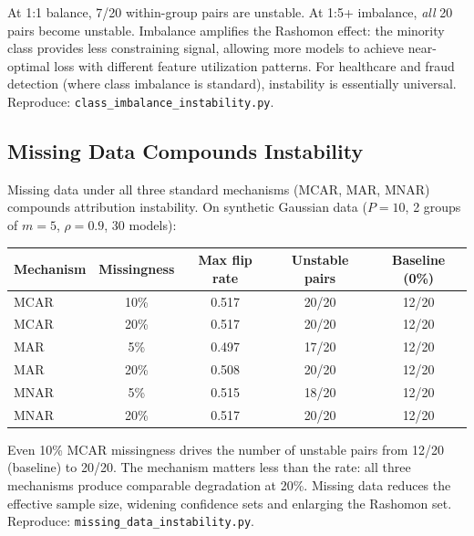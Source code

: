 \documentclass{article}
\begin{document}

At 1:1 balance, 7/20 within-group pairs are unstable. At 1:5+ imbalance, \emph{all} 20 pairs become unstable. Imbalance amplifies the Rashomon effect: the minority class provides less constraining signal, allowing more models to achieve near-optimal loss with different feature utilization patterns. For healthcare and fraud detection (where class imbalance is standard), instability is essentially universal.
Reproduce: \texttt{class\_imbalance\_instability.py}.

\subsection{Missing Data Compounds Instability}
\label{sec:missing-data}

Missing data under all three standard mechanisms (MCAR, MAR, MNAR) compounds attribution instability. On synthetic Gaussian data ($P{=}10$, 2 groups of $m{=}5$, $\rho{=}0.9$, 30 models):

\begin{center}
\small
\begin{tabular}{@{}lcccc@{}}
\toprule
Mechanism & Missingness & Max flip rate & Unstable pairs & Baseline (0\%) \\
\midrule
MCAR & 10\% & 0.517 & 20/20 & 12/20 \\
MCAR & 20\% & 0.517 & 20/20 & 12/20 \\
MAR  & 5\%  & 0.497 & 17/20 & 12/20 \\
MAR  & 20\% & 0.508 & 20/20 & 12/20 \\
MNAR & 5\%  & 0.515 & 18/20 & 12/20 \\
MNAR & 20\% & 0.517 & 20/20 & 12/20 \\
\bottomrule
\end{tabular}
\end{center}

Even 10\% MCAR missingness drives the number of unstable pairs from 12/20 (baseline) to 20/20. The mechanism matters less than the rate: all three mechanisms produce comparable degradation at 20\%. Missing data reduces the effective sample size, widening confidence sets and enlarging the Rashomon set.
Reproduce: \texttt{missing\_data\_instability.py}.
\end{document}
